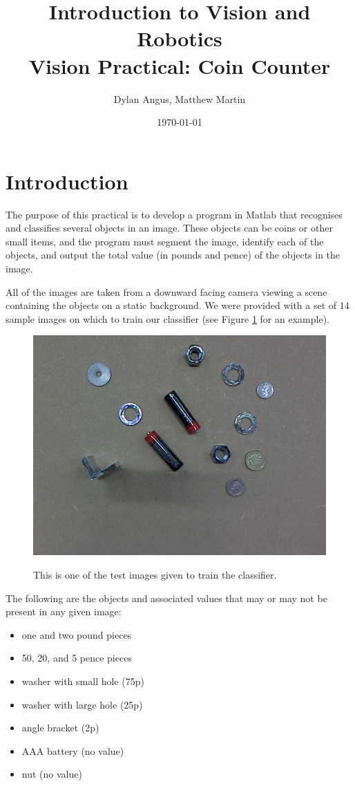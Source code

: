 \documentclass[12pt]{article}
\title{Introduction to Vision and Robotics\\Vision Practical: Coin Counter}
\author{Dylan Angus, Matthew Martin}
\date{\today}
\begin{document}
	
\maketitle

\section{Introduction}

The purpose of this practical is to develop a program in Matlab that recognises and classifies several objects in an image. These objects can be coins or other small items, and the program must segment the image, identify each of the objects, and output the total value (in pounds and pence) of the objects in the image.

All of the images are taken from a downward facing camera viewing a scene containing the objects on a static background. We were provided with a set of 14 sample images on which to train our classifier (see Figure \ref{fig:samplescene} for an example).

\begin{figure}
	\centering
	\includegraphics[width=0.75\linewidth]{02}
	\label{fig:samplescene}
	\caption{This is one of the test images given to train the classifier.}
\end{figure}

The following are the objects and associated values that may or may not be present in any given image:
\begin{itemize}
	\item one and two pound pieces
	\item 50, 20, and 5 pence pieces
	\item washer with small hole (75p)
	\item washer with large hole (25p)
	\item angle bracket (2p)
	\item AAA battery (no value)
	\item nut (no value)
\end{itemize}
\end{document}
